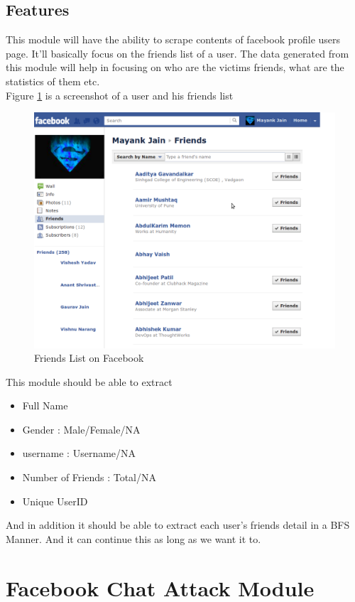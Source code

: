 \subsection{Features}
This module will have the ability to scrape contents of facebook profile users page. It'll basically focus on the friends list of a user.
The data generated from this module will help in focusing on who are the victims friends, what are the statistics of them etc.\\[0.5cm]
Figure \ref{fig:myfriends} is a screenshot of a user and his friends list
\begin{figure}[htb]
\centering
\includegraphics[scale=0.4]{project/myfriends}
\caption{Friends List on Facebook}
\label{fig:myfriends} %
\end{figure}

This module should be able to extract\\
\begin{itemize}
\item{Full Name}
\item{Gender : Male/Female/NA}
\item{username : Username/NA}
\item{Number of Friends : Total/NA}
\item{Unique UserID}
\end{itemize}

And in addition it should be able to extract each user's friends detail in a BFS Manner. And it can continue this as long as we want it to.

\section{Facebook Chat Attack Module}
